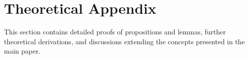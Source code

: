 \documentclass{article}
\newcommand{\ff}[1]{\todo[color=blue!30,size=\tiny]{FF: #1}}
\numberwithin{figure}{section}
\begin{document}







\appendix

\section{Theoretical Appendix}
\label{app:theory_appendix}
This section contains detailed proofs of propositions and lemmas, further theoretical derivations, and discussions extending the concepts presented in the main paper. 
\end{document}
